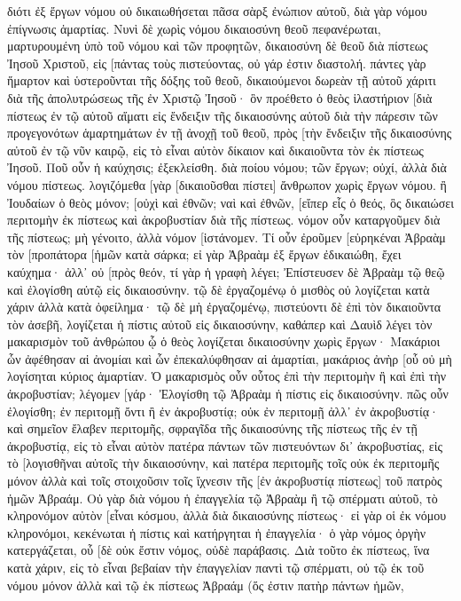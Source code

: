 διότι ἐξ ἔργων νόμου οὐ δικαιωθήσεται πᾶσα σὰρξ ἐνώπιον αὐτοῦ, διὰ γὰρ νόμου ἐπίγνωσις ἁμαρτίας. 
Νυνὶ δὲ χωρὶς νόμου δικαιοσύνη θεοῦ πεφανέρωται, μαρτυρουμένη ὑπὸ τοῦ νόμου καὶ τῶν προφητῶν, 
δικαιοσύνη δὲ θεοῦ διὰ πίστεως Ἰησοῦ Χριστοῦ, εἰς [πάντας τοὺς πιστεύοντας, οὐ γάρ ἐστιν διαστολή. 
πάντες γὰρ ἥμαρτον καὶ ὑστεροῦνται τῆς δόξης τοῦ θεοῦ, 
δικαιούμενοι δωρεὰν τῇ αὐτοῦ χάριτι διὰ τῆς ἀπολυτρώσεως τῆς ἐν Χριστῷ Ἰησοῦ· 
ὃν προέθετο ὁ θεὸς ἱλαστήριον [διὰ πίστεως ἐν τῷ αὐτοῦ αἵματι εἰς ἔνδειξιν τῆς δικαιοσύνης αὐτοῦ διὰ τὴν πάρεσιν τῶν προγεγονότων ἁμαρτημάτων 
ἐν τῇ ἀνοχῇ τοῦ θεοῦ, πρὸς [τὴν ἔνδειξιν τῆς δικαιοσύνης αὐτοῦ ἐν τῷ νῦν καιρῷ, εἰς τὸ εἶναι αὐτὸν δίκαιον καὶ δικαιοῦντα τὸν ἐκ πίστεως Ἰησοῦ. 
Ποῦ οὖν ἡ καύχησις; ἐξεκλείσθη. διὰ ποίου νόμου; τῶν ἔργων; οὐχί, ἀλλὰ διὰ νόμου πίστεως. 
λογιζόμεθα [γὰρ [δικαιοῦσθαι πίστει] ἄνθρωπον χωρὶς ἔργων νόμου. 
ἢ Ἰουδαίων ὁ θεὸς μόνον; [οὐχὶ καὶ ἐθνῶν; ναὶ καὶ ἐθνῶν, 
[εἴπερ εἷς ὁ θεός, ὃς δικαιώσει περιτομὴν ἐκ πίστεως καὶ ἀκροβυστίαν διὰ τῆς πίστεως. 
νόμον οὖν καταργοῦμεν διὰ τῆς πίστεως; μὴ γένοιτο, ἀλλὰ νόμον [ἱστάνομεν. 
Τί οὖν ἐροῦμεν [εὑρηκέναι Ἀβραὰμ τὸν [προπάτορα [ἡμῶν κατὰ σάρκα; 
εἰ γὰρ Ἀβραὰμ ἐξ ἔργων ἐδικαιώθη, ἔχει καύχημα· ἀλλ᾽ οὐ [πρὸς θεόν, 
τί γὰρ ἡ γραφὴ λέγει; Ἐπίστευσεν δὲ Ἀβραὰμ τῷ θεῷ καὶ ἐλογίσθη αὐτῷ εἰς δικαιοσύνην. 
τῷ δὲ ἐργαζομένῳ ὁ μισθὸς οὐ λογίζεται κατὰ χάριν ἀλλὰ κατὰ ὀφείλημα· 
τῷ δὲ μὴ ἐργαζομένῳ, πιστεύοντι δὲ ἐπὶ τὸν δικαιοῦντα τὸν ἀσεβῆ, λογίζεται ἡ πίστις αὐτοῦ εἰς δικαιοσύνην, 
καθάπερ καὶ Δαυὶδ λέγει τὸν μακαρισμὸν τοῦ ἀνθρώπου ᾧ ὁ θεὸς λογίζεται δικαιοσύνην χωρὶς ἔργων· 
Μακάριοι ὧν ἀφέθησαν αἱ ἀνομίαι καὶ ὧν ἐπεκαλύφθησαν αἱ ἁμαρτίαι, 
μακάριος ἀνὴρ [οὗ οὐ μὴ λογίσηται κύριος ἁμαρτίαν. 
Ὁ μακαρισμὸς οὖν οὗτος ἐπὶ τὴν περιτομὴν ἢ καὶ ἐπὶ τὴν ἀκροβυστίαν; λέγομεν [γάρ· Ἐλογίσθη τῷ Ἀβραὰμ ἡ πίστις εἰς δικαιοσύνην. 
πῶς οὖν ἐλογίσθη; ἐν περιτομῇ ὄντι ἢ ἐν ἀκροβυστίᾳ; οὐκ ἐν περιτομῇ ἀλλ᾽ ἐν ἀκροβυστίᾳ· 
καὶ σημεῖον ἔλαβεν περιτομῆς, σφραγῖδα τῆς δικαιοσύνης τῆς πίστεως τῆς ἐν τῇ ἀκροβυστίᾳ, εἰς τὸ εἶναι αὐτὸν πατέρα πάντων τῶν πιστευόντων δι᾽ ἀκροβυστίας, εἰς τὸ [λογισθῆναι αὐτοῖς τὴν δικαιοσύνην, 
καὶ πατέρα περιτομῆς τοῖς οὐκ ἐκ περιτομῆς μόνον ἀλλὰ καὶ τοῖς στοιχοῦσιν τοῖς ἴχνεσιν τῆς [ἐν ἀκροβυστίᾳ πίστεως] τοῦ πατρὸς ἡμῶν Ἀβραάμ. 
Οὐ γὰρ διὰ νόμου ἡ ἐπαγγελία τῷ Ἀβραὰμ ἢ τῷ σπέρματι αὐτοῦ, τὸ κληρονόμον αὐτὸν [εἶναι κόσμου, ἀλλὰ διὰ δικαιοσύνης πίστεως· 
εἰ γὰρ οἱ ἐκ νόμου κληρονόμοι, κεκένωται ἡ πίστις καὶ κατήργηται ἡ ἐπαγγελία· 
ὁ γὰρ νόμος ὀργὴν κατεργάζεται, οὗ [δὲ οὐκ ἔστιν νόμος, οὐδὲ παράβασις. 
Διὰ τοῦτο ἐκ πίστεως, ἵνα κατὰ χάριν, εἰς τὸ εἶναι βεβαίαν τὴν ἐπαγγελίαν παντὶ τῷ σπέρματι, οὐ τῷ ἐκ τοῦ νόμου μόνον ἀλλὰ καὶ τῷ ἐκ πίστεως Ἀβραάμ (ὅς ἐστιν πατὴρ πάντων ἡμῶν, 
